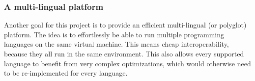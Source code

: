 \documentclass[twoside,11pt,a4paper]{article}
\newcommand{\java}[1]{\textsf{#1}}
\begin{document}
%
%
%

\subsubsection{A multi-lingual platform}

Another goal for this project is to provide an efficient multi-lingual (or polyglot) platform. The idea is to effortlessly be able to run multiple programming languages on the same virtual machine. This means cheap interoperability, because they all run in the same environment. This also allows every supported language to benefit from very complex optimizations, which would otherwise need to be re-implemented for every language.
\end{document}

